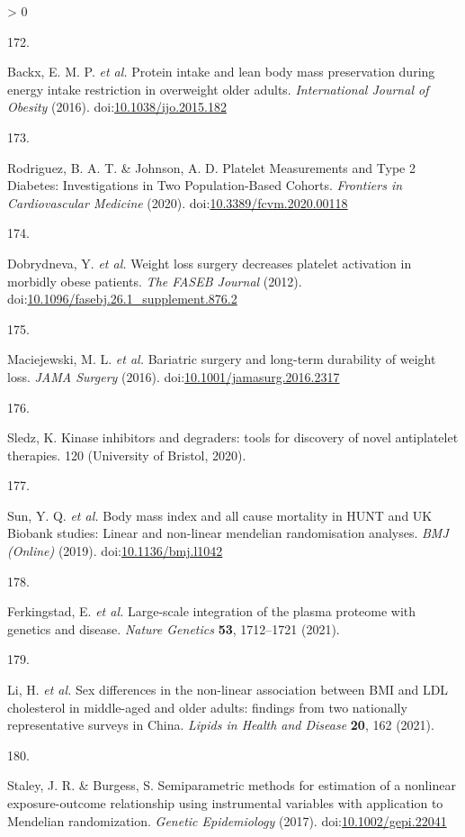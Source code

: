 \documentclass[11pt,twoside]{bristolthesis}
\newlength{\cslhangindent}
\newlength{\csllabelwidth}
\newenvironment{CSLReferences}[2] %
 {%
  \setlength{\parindent}{0pt}
  \ifodd #1 \everypar{\setlength{\hangindent}{\cslhangindent}}\ignorespaces\fi
  \ifnum #2 > 0
  \setlength{\parskip}{#2\baselineskip}
  \fi
 }%
 {}
\newcommand{\CSLLeftMargin}[1]{\parbox[t]{\csllabelwidth}{#1}}
\newcommand{\CSLRightInline}[1]{\parbox[t]{\linewidth - \csllabelwidth}{#1}\break}
\begin{document}
\begin{CSLReferences}{0}{0}
\leavevmode\hypertarget{ref-Backx2016}{}%
\CSLLeftMargin{172. }
\CSLRightInline{Backx, E. M. P. \emph{et al.} {Protein intake and lean body mass preservation during energy intake restriction in overweight older adults}. \emph{International Journal of Obesity} (2016). doi:\href{https://doi.org/10.1038/ijo.2015.182}{10.1038/ijo.2015.182}}

\leavevmode\hypertarget{ref-Rodriguez2020}{}%
\CSLLeftMargin{173. }
\CSLRightInline{Rodriguez, B. A. T. \& Johnson, A. D. {Platelet Measurements and Type 2 Diabetes: Investigations in Two Population-Based Cohorts}. \emph{Frontiers in Cardiovascular Medicine} (2020). doi:\href{https://doi.org/10.3389/fcvm.2020.00118}{10.3389/fcvm.2020.00118}}

\leavevmode\hypertarget{ref-Dobrydneva2012}{}%
\CSLLeftMargin{174. }
\CSLRightInline{Dobrydneva, Y. \emph{et al.} {Weight loss surgery decreases platelet activation in morbidly obese patients}. \emph{The FASEB Journal} (2012). doi:\href{https://doi.org/10.1096/fasebj.26.1_supplement.876.2}{10.1096/fasebj.26.1\_supplement.876.2}}

\leavevmode\hypertarget{ref-Maciejewski2016}{}%
\CSLLeftMargin{175. }
\CSLRightInline{Maciejewski, M. L. \emph{et al.} {Bariatric surgery and long-term durability of weight loss}. \emph{JAMA Surgery} (2016). doi:\href{https://doi.org/10.1001/jamasurg.2016.2317}{10.1001/jamasurg.2016.2317}}

\leavevmode\hypertarget{ref-Sledz2020}{}%
\CSLLeftMargin{176. }
\CSLRightInline{Sledz, K. {Kinase inhibitors and degraders: tools for discovery of novel antiplatelet therapies}. 120 (University of Bristol, 2020).}

\leavevmode\hypertarget{ref-Sun2019}{}%
\CSLLeftMargin{177. }
\CSLRightInline{Sun, Y. Q. \emph{et al.} {Body mass index and all cause mortality in HUNT and UK Biobank studies: Linear and non-linear mendelian randomisation analyses}. \emph{BMJ (Online)} (2019). doi:\href{https://doi.org/10.1136/bmj.l1042}{10.1136/bmj.l1042}}

\leavevmode\hypertarget{ref-Ferkingstad2021}{}%
\CSLLeftMargin{178. }
\CSLRightInline{Ferkingstad, E. \emph{et al.} {Large-scale integration of the plasma proteome with genetics and disease}. \emph{Nature Genetics} \textbf{53}, 1712--1721 (2021).}

\leavevmode\hypertarget{ref-Li2021}{}%
\CSLLeftMargin{179. }
\CSLRightInline{Li, H. \emph{et al.} {Sex differences in the non-linear association between BMI and LDL cholesterol in middle-aged and older adults: findings from two nationally representative surveys in China}. \emph{Lipids in Health and Disease} \textbf{20}, 162 (2021).}

\leavevmode\hypertarget{ref-Staley2017}{}%
\CSLLeftMargin{180. }
\CSLRightInline{Staley, J. R. \& Burgess, S. {Semiparametric methods for estimation of a nonlinear exposure-outcome relationship using instrumental variables with application to Mendelian randomization}. \emph{Genetic Epidemiology} (2017). doi:\href{https://doi.org/10.1002/gepi.22041}{10.1002/gepi.22041}}

\end{CSLReferences}
\end{document}

